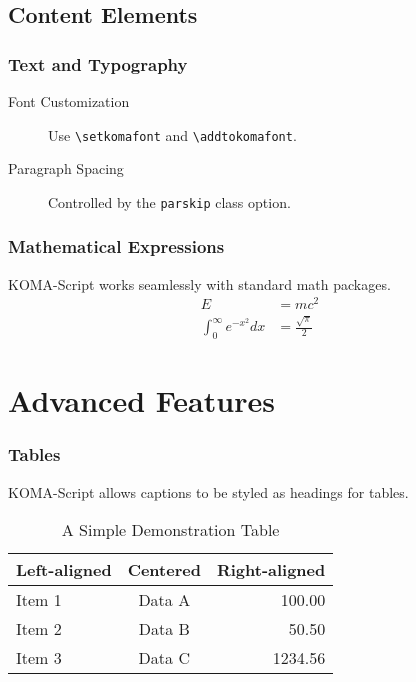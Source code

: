 \documentclass[
  a4paper,            %
  11pt,               %
  DIV=12,             %
  BCOR=5mm,           %
  twoside,            %
  headings=normal,    %
  toc=bibliography,   %
  toc=listof,         %
  listof=totoc,       %
  parskip=half,       %
  captions=tableheading, %
  numbers=autoendperiod, %
  appendixprefix=true,%
  chapterprefix=true, %
]{scrreprt}
\begin{document}
\chapter{Content Elements}
\section{Text and Typography}
\lipsum[6-7]
\begin{description}
    \item[Font Customization] Use \verb|\setkomafont| and \verb|\addtokomafont|.
  \item[Paragraph Spacing] Controlled by the \texttt{parskip} class option.
\end{description}

\section{Mathematical Expressions}
KOMA-Script works seamlessly with standard math packages.
\begin{align*}
  E                         & = mc^2                 \\
  \int_0^\infty e^{-x^2} dx & = \frac{\sqrt{\pi}}{2}
\end{align*}
\lipsum[8]

\part{Advanced Features}
\section{Tables}
KOMA-Script allows captions to be styled as headings for tables.
\begin{table}[hbtp]
  \caption{A Simple Demonstration Table}\label{tab:simple}
  \begin{tabular}{lcr}
    \toprule
    Left-aligned & Centered & Right-aligned \\
    \midrule
    Item 1       & Data A   & 100.00        \\
    Item 2       & Data B   & 50.50         \\
    Item 3       & Data C   & 1234.56       \\
    \bottomrule
  \end{tabular}
\end{table}
\end{document}
